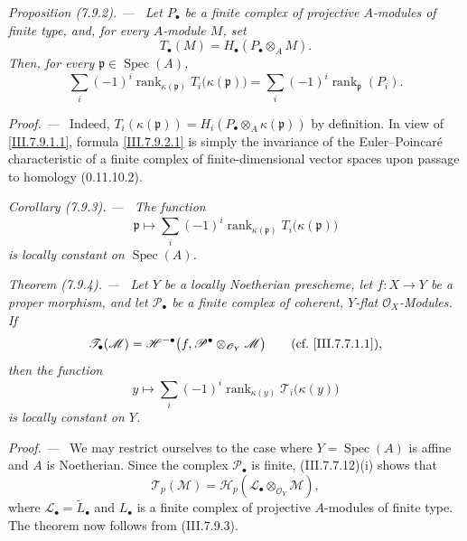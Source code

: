 \documentclass[10pt,oneside]{book}
\newcommand{\sh}[1]{\mathscr{#1}}
\newcommand{\kres}{\kappa}
\newcommand{\Spec}{\operatorname{Spec}}
\newcommand{\sref}[2][]{(#2)}
\newcommand{\oldpage}[2][]{\setcounter{footnote}{0}\marginpar{\scriptsize\textbf{#1}~|~#2}\ignorespaces}
\newenvironment{theorem}[1][]{\par\medskip\noindent\itshape Theorem (#1). ---\ }{\par}
\newenvironment{proposition}[1][]{\par\medskip\noindent\itshape Proposition (#1). ---\ }{\par}
\newenvironment{corollary}[1][]{\par\medskip\noindent\itshape Corollary (#1). ---\ }{\par}
\newenvironment{proof}{\par\medskip\noindent\textit{Proof. ---\ }}{\par}
\begin{document}
\begin{proposition}[7.9.2]
\label{III.7.9.2}
Let $P_\bullet$ be a finite complex of projective $A$-modules
of finite type, and, for every $A$-module $M$, set
\[
  T_\bullet(M)=H_\bullet(P_\bullet\otimes_A M).
\]
Then, for every $\mathfrak p\in\Spec(A)$,
\[
  \sum_i(-1)^i
    \operatorname{rank}_{\kres(\mathfrak p)}
      T_i\bigl(\kres(\mathfrak p)\bigr)
  =
  \sum_i(-1)^i\operatorname{rank}_{\mathfrak p}(P_i).
  \tag{7.9.2.1}\label{III.7.9.2.1}
\]
\end{proposition}

\begin{proof}
Indeed,
$T_i(\kres(\mathfrak p))
 =H_i(P_\bullet\otimes_A\kres(\mathfrak p))$ by definition.
In view of \eqref{III.7.9.1.1}, formula
\eqref{III.7.9.2.1} is simply the invariance of the
Euler--Poincar\'e characteristic of a finite complex of
finite-dimensional vector spaces upon passage to homology
\sref[0]{0.11.10.2}.
\end{proof}

\begin{corollary}[7.9.3]
\label{III.7.9.3}
The function
\[
  \mathfrak p\longmapsto
  \sum_i(-1)^i
    \operatorname{rank}_{\kres(\mathfrak p)}
      T_i\bigl(\kres(\mathfrak p)\bigr)
\]
is locally constant on $\Spec(A)$.
\end{corollary}

\begin{theorem}[7.9.4]
\label{III.7.9.4}
Let $Y$ be a locally Noetherian prescheme, let
$f:X\to Y$ be a proper morphism, and let
$\sh{P}_\bullet$ be a finite complex of coherent,
$Y$-flat $\sh{O}_X$-Modules.  If
\[
  \sh{T}_\bullet(\sh{M})
  =
  \mathscr{H}^{-\bullet}
    \bigl(f,\sh{P}^\bullet
      \otimes_{\sh{O}_Y}\sh{M}\bigr)
  \qquad\text{\rm(cf.~\eqref{III.7.7.1.1})},
\]
then the function
\oldpage[III]{209}
\[
  y\longmapsto
  \sum_i(-1)^i
    \operatorname{rank}_{\kres(y)}
      \sh{T}_i\bigl(\kres(y)\bigr)
  \tag{7.9.4.1}\label{III.7.9.4.1}
\]
is locally constant on $Y$.
\end{theorem}

\begin{proof}
We may restrict ourselves to the case where
$Y=\Spec(A)$ is affine and $A$ is Noetherian.  Since the
complex $\sh{P}_\bullet$ is finite, \sref{III.7.7.12}{(i)}
shows that
\[
  \sh{T}_p(\sh{M})
  =
  \mathscr{H}_p(\sh{L}_\bullet\otimes_{\sh{O}_Y}\sh{M}),
\]
where $\sh{L}_\bullet=\widetilde{L}_\bullet$ and
$L_\bullet$ is a finite complex of projective $A$-modules
of finite type.  The theorem now follows from
\sref{III.7.9.3}.
\end{proof}
\end{document}
